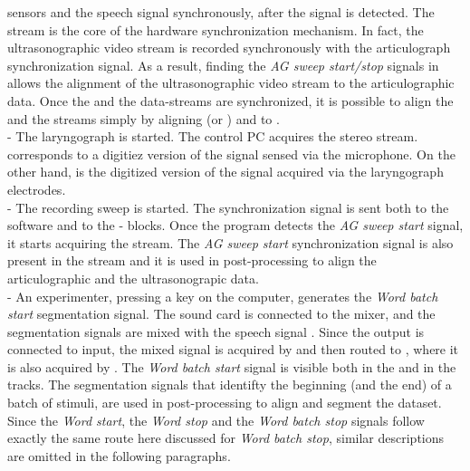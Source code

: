 sensors and the speech signal synchronously, after the  signal is
detected.
The  stream is the core of the hardware synchronization mechanism. 
In fact, the ultrasonographic video stream is recorded synchronously with the
articulograph synchronization signal.
As a result, finding the \emph{AG sweep start/stop} signals in  
allows the alignment of the ultrasonographic video stream to the articulographic 
data.
Once the  and the  data-streams are synchronized, it is possible
to align the  and the  streams simply by aligning
 (or ) and  to
.\\

 - The  laryngograph is started. 
The  control PC acquires the  stereo stream. 
 corresponds to a digitiez version of the 
signal sensed via the  microphone.
On the other hand,  is the digitized version of the signal acquired
via the laryngograph electrodes.\\

 - The  recording sweep is started.
The  synchronization signal is sent both to the 
software and to the - blocks.
Once the  program detects the \emph{AG sweep start} signal, it
starts acquiring the  stream.
The \emph{AG sweep start} synchronization signal is also present in the
 stream and it is used in post-processing to align the
articulographic and the ultrasonograpic data.\\

 - An experimenter, pressing a key on the  computer,
generates the \emph{Word batch start} segmentation signal.
The  sound card is connected to the  mixer, and the
segmentation signals are mixed with the speech signal .
Since the  output is connected to  input, the mixed
signal is acquired by  and then routed to , where it is also
acquired by .
The \emph{Word batch start} signal is visible both in the  and in
the  tracks.
The segmentation signals that identifty the beginning (and the end) of a batch
of stimuli, are used in post-processing to align and segment the dataset.
Since the \emph{Word start}, the \emph{Word stop} and the \emph{Word batch stop}
signals follow exactly the same route here discussed for \emph{Word batch
stop}, similar descriptions are omitted in the following paragraphs.\\

